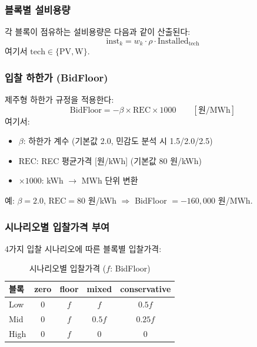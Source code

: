 \documentclass[11pt, a4paper]{article}
\begin{document}
\subsubsection{블록별 설비용량}

각 블록이 점유하는 설비용량은 다음과 같이 산출된다:
\begin{equation}\label{eq:block_inst}
    \text{inst}_k = w_k \cdot \rho \cdot \text{Installed}_{\text{tech}}
\end{equation}
여기서 $\text{tech} \in \{\text{PV}, \text{W}\}$.

\subsubsection{입찰 하한가 (BidFloor)}

제주형 하한가 규정을 적용한다:
\begin{equation}\label{eq:bid_floor}
    \boxed{\text{BidFloor} = -\beta \times \text{REC} \times 1000 \qquad [\text{원/MWh}]}
\end{equation}
여기서:
\begin{itemize}[noitemsep]
    \item $\beta$: 하한가 계수 (기본값 2.0, 민감도 분석 시 1.5/2.0/2.5)
    \item $\text{REC}$: REC 평균가격 [원/kWh] (기본값 80 원/kWh)
    \item $\times 1000$: kWh $\to$ MWh 단위 변환
\end{itemize}
예: $\beta = 2.0$, $\text{REC} = 80$ 원/kWh $\Rightarrow$ BidFloor $= -160{,}000$ 원/MWh.

\subsubsection{시나리오별 입찰가격 부여}

4가지 입찰 시나리오에 따른 블록별 입찰가격:

\begin{table}[H]
\centering
\caption{시나리오별 입찰가격 ($f$: BidFloor)}\label{tab:bid_scenarios}
\small
\begin{tabular}{lcccc}
\toprule
\textbf{블록} & \textbf{zero} & \textbf{floor} & \textbf{mixed} & \textbf{conservative} \\
\midrule
Low  & 0 & $f$ & $f$    & $0.5f$ \\
Mid  & 0 & $f$ & $0.5f$ & $0.25f$ \\
High & 0 & $f$ & 0      & 0 \\
\bottomrule
\end{tabular}
\end{table}
\end{document}
